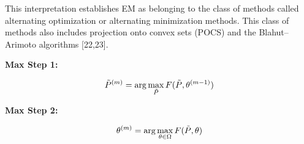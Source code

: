 \documentclass[onecolumn,12pt]{IEEEtran}
\begin{document}
This interpretation establishes EM as belonging to the class of methods called alternating optimization or alternating minimization methods. This class of methods also includes projection onto convex sets (POCS) and the Blahut–Arimoto algorithms [22,23].

\textbf{Max Step 1:}

\begin{equation}
  \tilde{P}^{(m)} = \arg\max_{\tilde{P}}F(\tilde{P},\theta^{(m-1)}) \\
\end{equation}

\textbf{Max Step 2:}

\begin{equation}
  \theta^{(m)} = \arg\max_{\theta\in \Omega} F(\tilde{P},\theta) \\
\end{equation}
\end{document}
